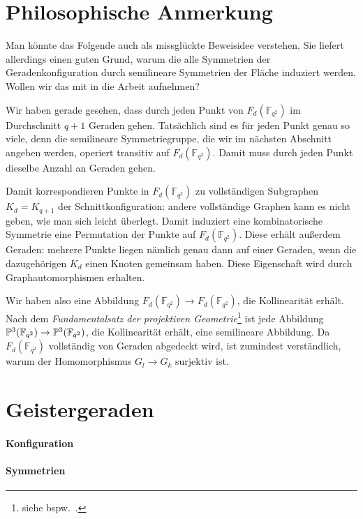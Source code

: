\section{Philosophische Anmerkung}
Man könnte das Folgende auch als missglückte Beweisidee verstehen. Sie liefert allerdings einen guten Grund, warum die alle Symmetrien der Geradenkonfiguration durch semilineare Symmetrien der Fläche induziert werden. \note Wollen wir das mit in die Arbeit aufnehmen?

Wir haben gerade gesehen, dass durch jeden Punkt von $F_d(\mathbb F_{q^2})$ im Durchschnitt $q+1$ Geraden gehen. Tatsächlich sind es für jeden Punkt genau so viele, denn die semilineare Symmetriegruppe, die wir im nächsten Abschnitt angeben werden, operiert transitiv auf $F_d(\mathbb F_{q^2})$. Damit muss durch jeden Punkt dieselbe Anzahl an Geraden gehen.

Damit korrespondieren Punkte in $F_d(\mathbb F_{q^2})$ zu vollständigen Subgraphen $K_d = K_{q+1}$ der Schnittkonfiguration: andere vollständige Graphen kann es nicht geben, wie man sich leicht überlegt. Damit induziert eine kombinatorische Symmetrie eine Permutation der Punkte auf $F_d(\mathbb F_{q^2})$. Diese erhält außerdem Geraden: mehrere Punkte liegen nämlich genau dann auf einer Geraden, wenn die dazugehörigen $K_d$ einen Knoten gemeinsam haben. Diese Eigenschaft wird durch Graphautomorphismen erhalten.

Wir haben also eine Abbildung $F_d(\mathbb F_{q^2}) \to F_d(\mathbb F_{q^2})$, die Kollinearität erhält. Nach dem \emph{Fundamentalsatz der projektiven Geometrie}\footnote{siehe bspw.~\cite[S.~72]{Dieudonne}.} ist jede Abbildung $\mathbb P^{3}(\mathbb F_{q^2}) \rightarrow \mathbb P^{3}(\mathbb F_{q^2})$, die Kollinearität erhält, eine semilineare Abbildung. Da $F_d(\mathbb F_{q^2})$ vollständig von Geraden abgedeckt wird, ist zumindest verständlich, warum der Homomorphismus $G_l \to G_k$ surjektiv ist.

\section{Geistergeraden}
\paragraph{Konfiguration}
\paragraph{Symmetrien}
